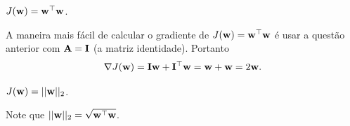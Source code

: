 \begin{exenumerate}
    \item $J(\mathbf{w})=\mathbf{w}^\top \mathbf{w}$.
    
    \begin{solution}
        A maneira mais f\'acil de calcular o gradiente de $J(\mathbf{w}) = \mathbf{w}^\top\mathbf{w}$ \'e usar a quest\~ao anterior com $\mathbf{A} = \mathbf{I}$ (a matriz identidade).
        Portanto
        \begin{equation}
            \nabla J(\mathbf{w}) = \mathbf{I}\mathbf{w} + \mathbf{I}^\top\mathbf{w} = \mathbf{w} + \mathbf{w} = 2\mathbf{w}.
        \end{equation}
        
    \end{solution}
    
    \item $J(\mathbf{w})=||\mathbf{w}||_2$.
    
    \begin{solution}
        Note que $||\mathbf{w}||_2 = \sqrt{\mathbf{w}^\top \mathbf{w}}$.
        

\end{solution}
\end{exenumerate}
